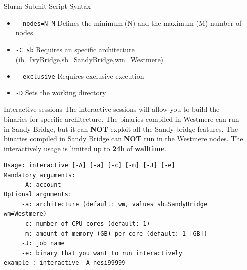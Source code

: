 \documentclass[final,t]{beamer}
\begin{document}
\begin{frame}[fragile]{}
\begin{columns}[t]
\begin{column}{.35\linewidth}
\begin{block}{Slurm Submit Script Syntax}
\begin{itemize}
        \item \verb|--nodes=N-M| Defines the minimum (N) and the maximum (M) number of nodes.
        \item \verb|-C sb| Requires an specific architecture (ib=IvyBridge,sb=SandyBridge,wm=Westmere)
        \item \verb|--exclusive| Requires exclusive execution
        \item \verb|-D| Sets the working directory
        \end{itemize}
      \end{block}

      \begin{block}{Interactive sessions}
      The interactive sessions will allow you to build the binaries for specific architecture. The binaries compiled in Westmere can run in Sandy Bridge, but it can \textbf{NOT} exploit all the Sandy bridge features. The binaries compiled in Sandy Bridge can \textbf{NOT} run in the Westmere nodes. The interactively usage is limited up to \textbf{24h} of \textbf{walltime}.
      \vspace*{-0.2cm}
	 \begin{verbatim}
Usage: interactive [-A] [-a] [-c] [-m] [-J] [-e]
Mandatory arguments:
	 -A: account
Optional arguments:
	 -a: architecture (default: wm, values sb=SandyBridge wm=Westmere)
	 -c: number of CPU cores (default: 1)
	 -m: amount of memory (GB) per core (default: 1 [GB])
	 -J: job name
	 -e: binary that you want to run interactively
example : interactive -A nesi99999
	\end{verbatim} 
      \end{block}


    \end{column}

    
    \begin{column}{.3\linewidth}
    


\end{column}
\end{columns}
\end{frame}
\end{document}
